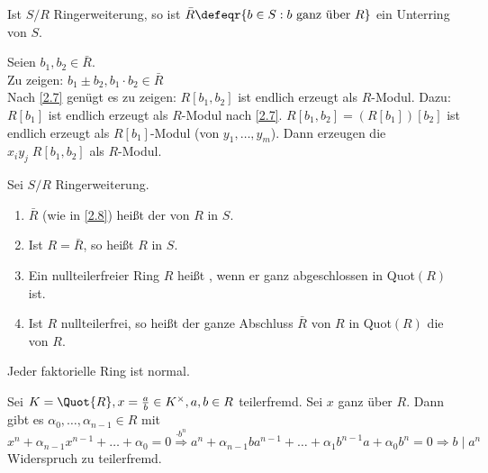 \begin{Prop}
\label{2.8}
  Ist $S/R$ Ringerweiterung, so ist $\bar{R} \defeqr \{ b \in S: b \text{ ganz 
  über } R \}$ ein Unterring von $S$.
\end{Prop}

\begin{Bew} 
  Seien $b_1, b_2 \in \bar{R}$.\\
  Zu zeigen: $b_1 \pm b_2, b_1 \cdot b_2 \in \bar{R}$\\
  Nach \ref{2.7} genügt es zu zeigen: $R[b_1, b_2]$ ist endlich erzeugt als
  $R$-Modul.
  Dazu: $R[b_1]$ ist endlich erzeugt als $R$-Modul nach \ref{2.7}.
  $R[b_1, b_2] = (R[b_1])[b_2]$ ist endlich erzeugt als $R[b_1]$-Modul (von
  $y_1, \dots, y_m$).
  Dann erzeugen die $x_i y_j \; R[b_1, b_2]$ als $R$-Modul.
\end{Bew}

\begin{Def} 
  Sei $S/R$ Ringerweiterung.
  \begin{enumerate} 
    \item $\bar{R}$ (wie in \ref{2.8}) heißt der  von $R$ in $S$.
    \item Ist $R = \bar{R}$, so heißt $R$  in $S$.
    \item Ein nullteilerfreier Ring $R$ heißt , wenn er ganz
          abgeschlossen in Quot$(R)$ ist.
    \item Ist $R$ nullteilerfrei, so heißt der ganze Abschluss $\bar{R}$ von $R$
          in Quot$(R)$ die  von $R$.
  \end{enumerate}
\end{Def}

\begin{Bem}
\label{2.10}
  Jeder faktorielle Ring ist normal.
\end{Bem}

\begin{Bew} 
  Sei $K=\Quot{R}, x= \frac{a}{b} \in K^\times, a,b \in R$ teilerfremd.
  Sei $x$ ganz über $R$. Dann gibt es $\alpha_0, \dots, \alpha_{n-1} \in R$ mit
  $x^n + \alpha_{n-1} x^{n-1} + \dots + \alpha_0 = 0 \overset{\cdot b^n}{\Rightarrow}
  a^n + \alpha_{n-1} b a^{n-1} + \dots + \alpha_1 b^{n-1} a + \alpha_0 b^n = 0
  \Rightarrow b \mid a^n$ Widerspruch zu teilerfremd.
\end{Bew}
